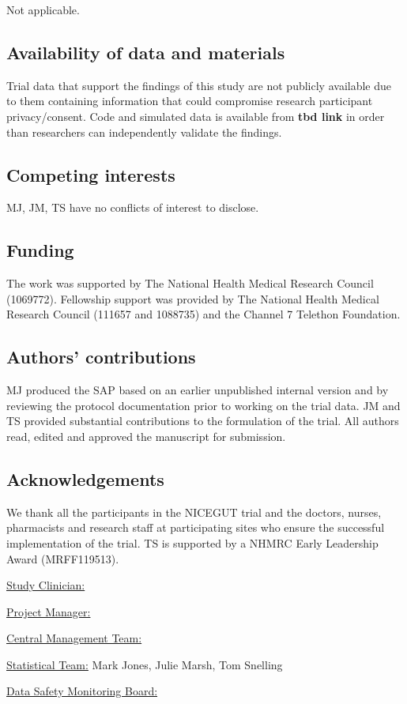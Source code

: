 \documentclass[a4paper]{article}
\begin{document}
Not applicable.

\subsection{Availability of data and materials}

Trial data that support the findings of this study are not publicly available due to them containing information that could compromise research participant privacy/consent.
Code and simulated data is available from \textbf{tbd link} in order than researchers can independently validate the findings.

\subsection{Competing interests} 

MJ, JM, TS have no conflicts of interest to disclose.

\subsection{Funding}

The work was supported by The National Health Medical Research Council (1069772).
Fellowship support was provided by The National Health Medical Research Council (111657 and 1088735) and the Channel 7 Telethon Foundation.

\subsection{Authors' contributions}

MJ produced the SAP based on an earlier unpublished internal version and by reviewing the protocol documentation prior to working on the trial data.
JM and TS provided substantial contributions to the formulation of the trial. 
All authors read, edited and approved the manuscript for submission.

\subsection{Acknowledgements}

We thank all the participants in the NICEGUT trial and the doctors, nurses, pharmacists and research staff at participating sites who ensure the successful implementation of the trial.
TS is supported by a NHMRC Early Leadership Award (MRFF119513). 

\underline{Study Clinician:} 

\underline{Project Manager:}

\underline{Central Management Team:} 

\underline{Statistical Team:} Mark Jones, Julie Marsh, Tom Snelling

\underline{Data Safety Monitoring Board:} 

\appendix





\footnotesize~\vspace{-1.25cm}


\end{document}
